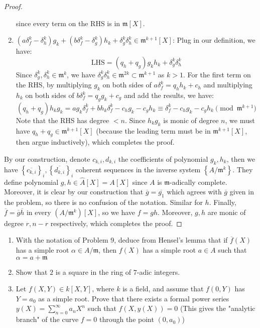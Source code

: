 \documentclass{solution}
\begin{document}
\begin{proof}
\begin{enumerate}
        since every term on the RHS is in $\mathfrak{m}[X]$.
        \item $(a \delta_f^k - \delta_h^k) g_k + (b \delta_f^k - \delta_g^k) h_k + \delta_g^k \delta_h^k \in \mathfrak{m}^{k + 1}[X]$: Plug in our definition, we have:
        $$\textrm{LHS} = (q_h + q_{g})g_kh_k + \delta_g^k \delta_h^k$$
        Since $\delta_g^k, \delta_h^k \in \mathfrak{m}^k$, we have $\delta_g^k \delta_h^k \in \mathfrak{m}^{2k} \subset \mathfrak{m}^{k + 1}$ as $k \gt 1$. For the first term on the RHS, by multiplying $g_k$ on both sides of $a \delta_f^k = q_h h_k + c_h$ and multiplying $h_k$ on both sides of $b \delta_f^k = q_g g_k + c_g$ and add the results, we have:
        $$(q_h + q_g) h_kg_k = a g_k \delta_f^k + b h_k \delta_f^k - c_hg_k - c_g h_k \equiv \delta_f^k - c_hg_k - c_gh_k \pmod {\mathfrak{m}^{k + 1}}$$
        Note that the RHS has degree $\lt n$. Since $h_kg_k$ is monic of degree $n$, we must have $q_h + q_g \in \mathfrak{m}^{k + 1}[X]$ (because the leading term must be in $\mathfrak{m}^{k + 1}[X]$, then argue inductively), which completes the proof.
    \end{enumerate}

    By our construction, denote $c_{k, i}, d_{k, i}$ the coefficients of polynomial $g_k, h_k$, then we have $\left\lbrace \overline{c_{k, i}} \right\rbrace_{i}, \left\lbrace \overline{d_{k, i}} \right\rbrace_i$ coherent sequences in the inverse system $\left\lbrace A / \mathfrak{m}^k \right\rbrace$. They define polynomial $g, h \in \hat{A}[X] = A[X]$ since $A$ is $\mathfrak{m}$-adically complete. Moreover, it is clear by our construction that $\overline{g} = \overline{g_1}$ which agrees with $\overline{g}$ given in the problem, so there is no confusion of the notation. Similar for $h$. Finally, $\overline{f} = \overline{g} \overline{h}$ in every $(A / \mathfrak{m}^k)[X]$, so we have $f = gh$. Moreover, $g, h$ are monic of degree $r, n - r$ respectively, which completes the proof.
\end{proof}

\begin{problem}
    \begin{enumerate}
        \item With the notation of Problem 9, deduce from Hensel's lemma that if $\overline{f}(X)$ has a simple root $\alpha \in A / \mathfrak{m}$, then $f(X)$ has a simple root $a \in A$ such that $\alpha = a + \mathfrak{m}$
        \item Show that $2$ is a square in the ring of $7$-adic integers.
        \item Let $f(X, Y) \in k[X, Y]$, where $k$ is a field, and assume that $f(0, Y)$ has $Y = a_0$ as a simple root. Prove that there exists a formal power series $y(X) = \sum\limits_{n = 0}^{\infty} a_n X^n$ such that $f(X, y(X)) = 0$
        (This gives the "analytic branch" of the curve $f = 0$ through the point $(0, a_0)$)
    \end{enumerate}
\end{problem}
\end{document}
